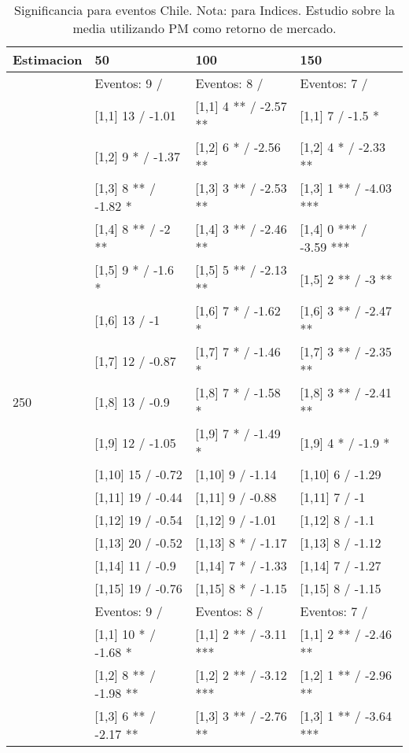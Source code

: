 \begin{table}

\caption{Significancia para eventos Chile. Nota: para Indices. Estudio sobre la media utilizando PM como retorno de mercado.}
\centering
\begin{tabular}[t]{llll}
\toprule
Estimacion & 50 & 100 & 150\\
\midrule
 & Eventos:  9 / & Eventos:  8 / & Eventos:  7 /\\
 & {}[1,1] 13  / -1.01 & {}[1,1] 4 ** / -2.57 ** & {}[1,1] 7  / -1.5 *\\
 & {}[1,2] 9 * / -1.37 & {}[1,2] 6 * / -2.56 ** & {}[1,2] 4 * / -2.33 **\\
 & {}[1,3] 8 ** / -1.82 * & {}[1,3] 3 ** / -2.53 ** & {}[1,3] 1 ** / -4.03 ***\\
 & {}[1,4] 8 ** / -2 ** & {}[1,4] 3 ** / -2.46 ** & {}[1,4] 0 *** / -3.59 ***\\
\addlinespace
 & {}[1,5] 9 * / -1.6 * & {}[1,5] 5 ** / -2.13 ** & {}[1,5] 2 ** / -3 **\\
 & {}[1,6] 13  / -1 & {}[1,6] 7 * / -1.62 * & {}[1,6] 3 ** / -2.47 **\\
 & {}[1,7] 12  / -0.87 & {}[1,7] 7 * / -1.46 * & {}[1,7] 3 ** / -2.35 **\\
250 & {}[1,8] 13  / -0.9 & {}[1,8] 7 * / -1.58 * & {}[1,8] 3 ** / -2.41 **\\
 & {}[1,9] 12  / -1.05 & {}[1,9] 7 * / -1.49 * & {}[1,9] 4 * / -1.9 *\\
\addlinespace
 & {}[1,10] 15  / -0.72 & {}[1,10] 9  / -1.14 & {}[1,10] 6  / -1.29\\
 & {}[1,11] 19  / -0.44 & {}[1,11] 9  / -0.88 & {}[1,11] 7  / -1\\
 & {}[1,12] 19  / -0.54 & {}[1,12] 9  / -1.01 & {}[1,12] 8  / -1.1\\
 & {}[1,13] 20  / -0.52 & {}[1,13] 8 * / -1.17 & {}[1,13] 8  / -1.12\\
 & {}[1,14] 11  / -0.9 & {}[1,14] 7 * / -1.33 & {}[1,14] 7  / -1.27\\
\addlinespace
 & {}[1,15] 19  / -0.76 & {}[1,15] 8 * / -1.15 & {}[1,15] 8  / -1.15\\
 & Eventos:  9 / & Eventos:  8 / & Eventos:  7 /\\
 & {}[1,1] 10 * / -1.68 * & {}[1,1] 2 ** / -3.11 *** & {}[1,1] 2 ** / -2.46 **\\
 & {}[1,2] 8 ** / -1.98 ** & {}[1,2] 2 ** / -3.12 *** & {}[1,2] 1 ** / -2.96 **\\
 & {}[1,3] 6 ** / -2.17 ** & {}[1,3] 3 ** / -2.76 ** & {}[1,3] 1 ** / -3.64 ***\\

\end{tabular}
\end{table}
